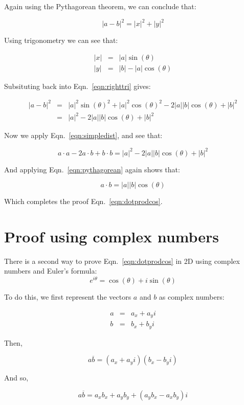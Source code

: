 \documentclass{article}[11pt]
\begin{document}
Again using the Pythagorean theorem, we can conclude that:

\begin{equation}
\label{eqn:righttri}
|a - b|^2 = |x|^2 + |y|^2
\end{equation}

Using trigonometry we can see that:

\begin{eqnarray*}
|x| & = & |a| \sin(\theta) \\
|y| & = & |b| - |a| \cos(\theta)
\end{eqnarray*}

Subsituting back into Eqn.~\ref{eqn:righttri} gives:

\begin{eqnarray*}
|a - b|^2  & = & |a|^2 \sin(\theta)^2 + |a|^2 \cos(\theta)^2 - 2 |a| |b| \cos(\theta) + |b|^2 \\
& = & |a|^2 - 2 |a| |b| \cos(\theta) + |b|^2
\end{eqnarray*}

Now we apply Eqn.~\ref{eqn:simpledist}, and see that:

\[  a \cdot a - 2 a \cdot b + b \cdot b = |a|^2 - 2 |a| |b| \cos(\theta) + |b|^2 \]

And applying Eqn.~\ref{eqn:pythagorean} again shows that:

\[ a \cdot b = |a| |b| \cos(\theta) \]

Which completes the proof Eqn.~\ref{eqn:dotprodcos}.

\section{Proof using complex numbers}
There is a second way to prove Eqn.~\ref{eqn:dotprodcos} in 2D using complex numbers and Euler's formula:
\[ e^{i \theta} = \cos(\theta) + i \sin(\theta) \]

To do this, we first represent the vectors $a$ and $b$ as complex numbers:

\begin{eqnarray*}
a & = & a_x + a_y i \\
b & = & b_x + b_y i
\end{eqnarray*}

Then,

\[ a \overline{b} = (a_x + a_y i)(b_x - b_y i) \]

And so,

\begin{equation}
\label{eqn:cartesian}
a \overline{b} =  a_x b_x + a_y b_y + (a_y b_x - a_x b_y) i
\end{equation}
\end{document}
